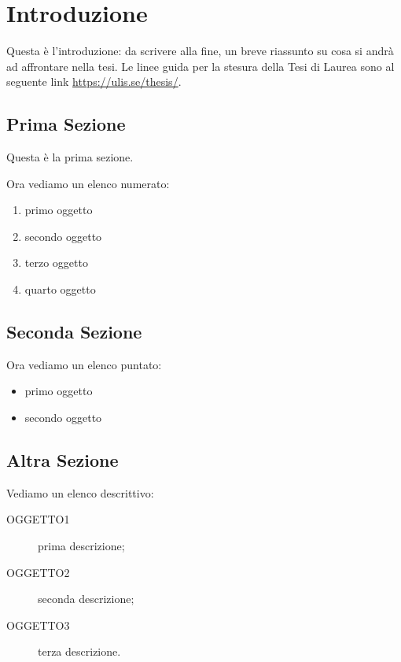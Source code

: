 \documentclass[12pt,a4paper,openright,twoside]{report}
\begin{document}
\chapter{Introduzione} 
\lhead[\fancyplain{}{\bfseries\thepage}]{\fancyplain{}{\bfseries\rightmark}}
Questa \`e l'introduzione: da scrivere alla fine, un breve riassunto su cosa si andr\`a ad affrontare nella tesi.
Le linee guida per la stesura della Tesi di Laurea sono al seguente link \href{https://ulis.se/thesis/}{https://ulis.se/thesis/}.

\section{Prima Sezione} %
Questa \`e la prima sezione.

Ora vediamo un elenco numerato: %
\begin{enumerate}
\item primo oggetto
\item secondo oggetto
\item terzo oggetto
\item quarto oggetto
\end{enumerate}




\section{Seconda Sezione}
Ora vediamo un elenco puntato:
\begin{itemize} %
\item primo oggetto
\item secondo oggetto
\end{itemize}


\section{Altra Sezione}
Vediamo un elenco descrittivo:
\begin{description} %
  \item[OGGETTO1] prima descrizione;
  \item[OGGETTO2] seconda descrizione;
  \item[OGGETTO3] terza descrizione.
\end{description}
\end{document}
